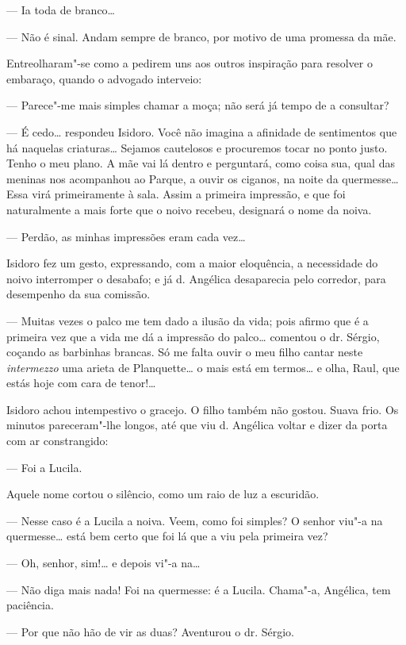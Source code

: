 --- Ia toda de branco\ldots{}

--- Não é sinal. Andam sempre de branco, por motivo de uma promessa da
mãe.

Entreolharam"-se como a pedirem uns aos outros inspiração para resolver o
embaraço, quando o advogado interveio:

--- Parece"-me mais simples chamar a moça; não será já tempo de a
consultar?

--- É cedo\ldots{} respondeu Isidoro. Você não imagina a afinidade de
sentimentos que há naquelas criaturas\ldots{} Sejamos cautelosos e procuremos
tocar no ponto justo. Tenho o meu plano. A mãe vai lá dentro e
perguntará, como coisa sua, qual das meninas nos acompanhou ao Parque, a
ouvir os ciganos, na noite da quermesse\ldots{} Essa virá primeiramente à
sala. Assim a primeira impressão, e que foi naturalmente a mais forte
que o noivo recebeu, designará o nome da noiva.

--- Perdão, as minhas impressões eram cada vez\ldots{}

Isidoro fez um gesto, expressando, com a maior eloquência, a necessidade
do noivo interromper o desabafo; e já d. Angélica desaparecia pelo
corredor, para desempenho da sua comissão.

--- Muitas vezes o palco me tem dado a ilusão da vida; pois afirmo que é
a primeira vez que a vida me dá a impressão do palco\ldots{} comentou o dr.
Sérgio, coçando as barbinhas brancas. Só me falta ouvir o meu filho
cantar neste \emph{intermezzo} uma arieta de Planquette\ldots{} o mais está
em termos\ldots{} e olha, Raul, que estás hoje com cara de tenor!\ldots{}

Isidoro achou intempestivo o gracejo. O filho também não gostou. Suava
frio. Os minutos pareceram"-lhe longos, até que viu d. Angélica voltar e
dizer da porta com ar constrangido:

--- Foi a Lucila.

Aquele nome cortou o silêncio, como um raio de luz a escuridão.

--- Nesse caso é a Lucila a noiva. Veem, como foi simples? O senhor
viu"-a na quermesse\ldots{} está bem certo que foi lá que a viu pela primeira
vez?

--- Oh, senhor, sim!\ldots{} e depois vi"-a na\ldots{}

--- Não diga mais nada! Foi na quermesse: é a Lucila. Chama"-a, Angélica,
tem paciência.

--- Por que não hão de vir as duas? Aventurou o dr. Sérgio.

